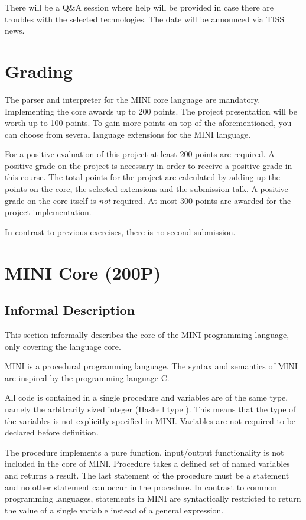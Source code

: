 \documentclass{article}
\begin{document}
There will be a Q\&A session where help will be provided in case there are troubles with the selected technologies. The date will be announced via TISS news.

\section{Grading}

The parser and interpreter for the MINI core language are mandatory. Implementing the core awards up to 200 points. The project presentation will be worth up to 100 points. To gain more points on top of the aforementioned, you can choose from several language extensions for the MINI language.

For a positive evaluation of this project at least 200 points are required. A positive grade on the project is necessary in order to receive a positive grade in this course.
The total points for the project are calculated by adding up the points on the core, the selected extensions and the submission talk. A positive grade on the core itself is \textit{not} required. At most 300 points are awarded for the project implementation.

In contrast to previous exercises, there is no second submission.

\section{MINI Core (200P)}

\subsection{Informal Description}

This section informally describes the core of the MINI programming language, only covering the language core.

MINI is a procedural programming language. The syntax and semantics of MINI are inspired by the \href{https://en.wikipedia.org/wiki/C_(programming_language)}{programming language C}.

All code is contained in a single procedure  and variables are of the same type, namely the arbitrarily sized integer (Haskell type ). This means that the type of the variables is not explicitly specified in MINI. Variables are not required to be declared before definition.

The procedure  implements a pure function, input/output functionality is not included in the core of MINI. Procedure  takes a defined set of named variables and returns a result. The last statement of the procedure must be a  statement and no other  statement can occur in the procedure. In contrast to common programming languages,  statements in MINI are syntactically restricted to return the value of a single variable instead of a general expression.
\end{document}

